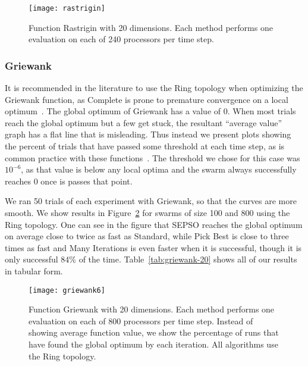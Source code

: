 \documentclass[smallcondensed]{svjour3}
\newcommand{\fig}[1]{Figure~\ref{fig:#1}}
\newcommand{\tabref}[1]{Table~\ref{tab:#1}}
\begin{document}
\begin{figure}
  \centering
  \texttt{[image: rastrigin]}
  \caption{Function Rastrigin with 20 dimensions.  Each method performs one
  evaluation on each of 240 processors per time step.}
  \label{fig:rastrigin}
\end{figure}

\subsubsection{Griewank}
\label{sec:griewank-20}

It is recommended in the literature to use the Ring topology when optimizing
the Griewank function, as Complete is prone to premature convergence on a local
optimum~\citep{bratton-2007-defining-a-standard-for-pso}.  The global optimum
of Griewank has a value of 0.  When most trials reach the global optimum but a
few get stuck, the resultant ``average value'' graph has a flat line that is
misleading.  Thus instead we present plots showing the percent of trials that
have passed some threshold at each time step, as is common practice with these
functions~\citep{mendes-2004-population-topologies-in-pso}.  The threshold we
chose for this case was $10^{-6}$, as that value is below any local optima and
the swarm always successfully reaches 0 once is passes that point.

We ran 50 trials of each experiment with Griewank, so that the curves are more
smooth.  We show results in \fig{basic-griewank1} for swarms of size 100 and
800 using the Ring topology.  One can see in the figure that SEPSO reaches the
global optimum on average close to twice as fast as Standard, while Pick Best
is close to three times as fast and Many Iterations is even faster when it is
successful, though it is only successful 84\% of the time.
\tabref{griewank-20} shows all of our results in tabular form.

\begin{figure}
  \centering
  \texttt{[image: griewank6]}
  \caption{Function Griewank with 20 dimensions.  Each method performs one
  evaluation on each of 800 processors per time step.  Instead of showing
  average function value, we show the percentage of runs that have found the
  global optimum by each iteration.  All algorithms use the Ring topology.}
  \label{fig:basic-griewank1}
\end{figure}
\end{document}
